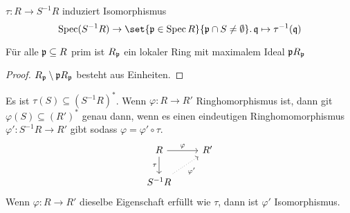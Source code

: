 \begin{Kor}
    $\tau\colon R\to S^{-1}R$ induziert Isomorphismus $$\Spec(S^{-1}R)\to \set{\frakp\in\Spec R}{\frakp\cap S\neq\emptyset}.\, \frakq\mapsto \tau^{-1}(\frakq)$$
\end{Kor}
\begin{Kor}
    Für alle $\mathfrak{p}\subseteq R$ prim ist $R_{\mathfrak{p}}$ ein lokaler Ring mit maximalem Ideal $\mathfrak{p} R_{\mathfrak{p}}$
\end{Kor}
\begin{proof}
    $R_{\mathfrak{p}}\setminus \mathfrak{p} R_{\mathfrak{p}}$ besteht aus Einheiten.
\end{proof}
\begin{Satz}
Es ist $\tau(S)\subseteq (S^{-1}R)^*$. Wenn $\varphi\colon R\to R'$ Ringhomorphismus ist, dann git $\varphi(S)\subseteq (R')^*$ genau dann, wenn es einen eindeutigen Ringhomomorphismus $\varphi'\colon S^{-1}R\to R'$ gibt sodass $\varphi=\varphi'\circ\tau.$
$$%
\begin{tikzcd}
R \arrow[d, "\tau"'] \arrow[r, "\varphi"] & R' \\
S^{-1}R \arrow[ru, "\varphi'"', dotted]   &   
\end{tikzcd}$$
Wenn $\varphi\colon R\to R'$ dieselbe Eigenschaft erfüllt wie $\tau$, dann ist $\varphi'$ Isomorphismus.
\end{Satz}

